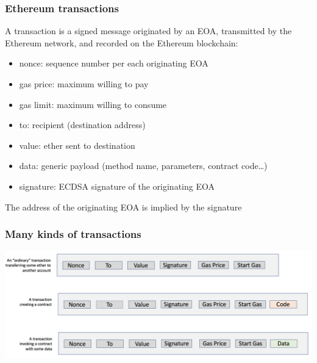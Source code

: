 \documentclass[11pt]{beamer}  %
\begin{document}
\begin{frame}\frametitle{Ethereum transactions}

  \begin{greenbox}{}
    A transaction is a signed message originated by an EOA, transmitted
    by the Ethereum network, and recorded on the Ethereum blockchain:
    \begin{itemize}
    \item nonce: sequence number per each originating EOA
    \item gas price: maximum willing to pay
    \item gas limit: maximum willing to consume
    \item to: recipient (destination address)
    \item value: ether sent to destination
    \item data: generic payload (method name, parameters, contract code\ldots)
    \item signature: ECDSA signature of the originating EOA
    \end{itemize}
  \end{greenbox}

  \begin{center}
    The address of the originating EOA is implied by the signature
  \end{center}

\end{frame}

\begin{frame}\frametitle{Many kinds of transactions}

  \begin{center}
    \includegraphics[width=\textwidth,clip=false]{pictures/many-transactions.png}
  \end{center}

\end{frame}
\end{document}

